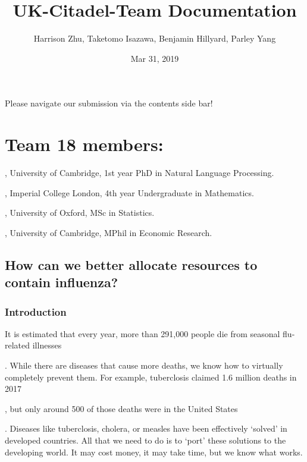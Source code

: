 \documentclass[letterpaper,10pt,english]{sphinxmanual}
\title{UK-Citadel-Team Documentation}
\date{Mar 31, 2019}
\author{Harrison Zhu, Taketomo Isazawa, Benjamin Hillyard, Parley Yang}
\begin{document}
\pagestyle{empty}
\sphinxmaketitle
\pagestyle{plain}
\sphinxtableofcontents
\pagestyle{normal}
\label{\detokenize{index::doc}}


Please navigate our submission via the contents side bar!


\chapter{Team 18 members:}
\label{\detokenize{index:team-18-members}}
\noindent{}

,
University of Cambridge, 1st year PhD in Natural Language Processing.

, Imperial College London,
4th year Undergraduate in Mathematics.

,
University of Oxford, MSc in Statistics.

, University of Cambridge,
MPhil in Economic Research.


\section{How can we better allocate resources to contain influenza?}
\label{\detokenize{executive_summary:how-can-we-better-allocate-resources-to-contain-influenza}}\label{\detokenize{executive_summary::doc}}

\subsection{Introduction}
\label{\detokenize{executive_summary:introduction}}
It is estimated that every year, more than 291,000 people die from seasonal flu-related illnesses %
\begin{footnote}[1]\sphinxAtStartFootnote
{}
%
\end{footnote}. While there are diseases that cause more deaths, we know how to virtually completely prevent them. For example, tuberclosis claimed 1.6 million deaths in 2017 %
\begin{footnote}[2]\sphinxAtStartFootnote
{}
%
\end{footnote}, but only around 500 of those deaths were in the United States %
\begin{footnote}[3]\sphinxAtStartFootnote
{}
%
\end{footnote}. Diseases like tuberclosis, cholera, or measles have been effectively ‘solved’ in developed countries. All that we need to do is to ‘port’ these solutions to the developing world. It may cost money, it may take time, but we know what works.
\end{document}
